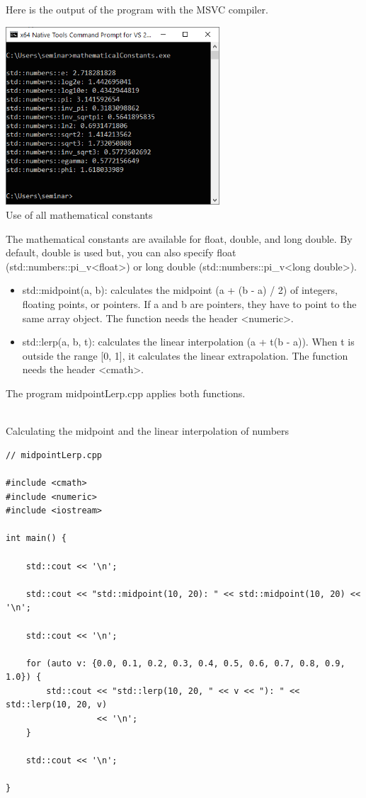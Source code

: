 Here is the output of the program with the MSVC compiler.

\begin{center}
\includegraphics[width=0.6\textwidth]{content/3/chapter5/images/17.png}\\
Use of all mathematical constants
\end{center}

The mathematical constants are available for float, double, and long double. By default, double is used but, you can also specify float (std::numbers::pi\_v<float>) or long double (std::numbers::pi\_v<long double>).


\begin{itemize}
\item 
std::midpoint(a, b): calculates the midpoint (a + (b - a) / 2) of integers, floating points, or pointers. If a and b are pointers, they have to point to the same array object. The function needs the header <numeric>.

\item 
std::lerp(a, b, t): calculates the linear interpolation (a + t(b - a)). When t is outside the range [0, 1], it calculates the linear extrapolation. The function needs the header <cmath>.
\end{itemize}

The program midpointLerp.cpp applies both functions.

\hspace*{\fill} \\ %
\noindent
Calculating the midpoint and the linear interpolation of numbers
\begin{lstlisting}[style=styleCXX]
// midpointLerp.cpp

#include <cmath>
#include <numeric>
#include <iostream>

int main() {
	
	std::cout << '\n';
	
	std::cout << "std::midpoint(10, 20): " << std::midpoint(10, 20) << '\n';
	
	std::cout << '\n';
	
	for (auto v: {0.0, 0.1, 0.2, 0.3, 0.4, 0.5, 0.6, 0.7, 0.8, 0.9, 1.0}) {
		std::cout << "std::lerp(10, 20, " << v << "): " << std::lerp(10, 20, v)
				  << '\n';
	}
	
	std::cout << '\n';
	
}
\end{lstlisting}

